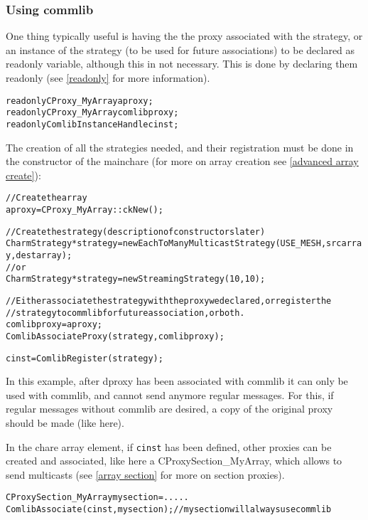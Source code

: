\subsubsection{Using commlib}

One thing typically useful is having the the proxy associated with the strategy,
or an instance of the strategy (to be used for future associations) to be
declared as readonly variable, although this in not necessary. This is done by
declaring them readonly (see \ref{readonly} for more information).

\begin{alltt}
  readonly CProxy\_MyArray aproxy;
  readonly CProxy\_MyArray comlibproxy;
  readonly ComlibInstanceHandle cinst;
\end{alltt}

The creation of all the strategies needed, and their registration must be done
in the constructor of the mainchare (for more on array creation see
\ref{advanced array create}):

\begin{alltt}
  // Create the array
  aproxy = CProxy\_MyArray::ckNew();

  // Create the strategy (description of constructors later)
  CharmStrategy *strategy = new EachToManyMulticastStrategy(USE_MESH, srcarray, destarray);
  //or
  CharmStrategy *strategy = new StreamingStrategy(10,10);

  // Either associate the strategy with the proxy we declared, or register the
  // strategy to commlib for future association, or both.
  comlibproxy = aproxy;
  ComlibAssociateProxy(strategy, comlibproxy);

  cinst = ComlibRegister(strategy);
\end{alltt}

In this example, after dproxy has been associated with commlib it can only be
used with commlib, and cannot send anymore regular messages. For this, if
regular messages without commlib are desired, a copy of the original proxy
should be made (like here).

In the chare array element, if {\texttt{cinst}} has been defined, other proxies
can be created and associated, like here a CProxySection\_MyArray, which allows
to send multicasts (see \ref{array section} for more on section proxies).

\begin{alltt}
  CProxySection\_MyArray mysection = .....
  ComlibAssociate(cinst, mysection);  // mysection will always use commlib
\end{alltt}

